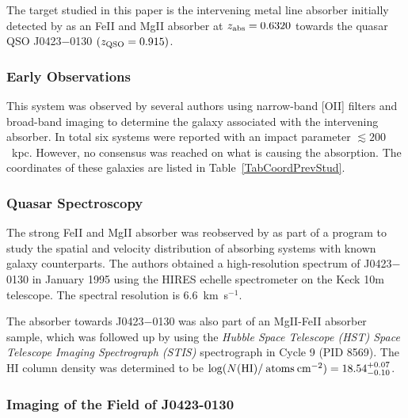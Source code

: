 \documentclass[a4paper,fleqn,usenatbib]{mnras}
\begin{document}
The target studied in this paper is the intervening metal line absorber initially detected by \mbox{\citet{Wills1980Observations}} as an FeII and MgII absorber at $z_{\rm abs} = 0.6320$ towards the quasar QSO J0423$-$0130 $(z_{\rm QSO} = 0.915)$.

\subsubsection{Early Observations}

This system was observed by several authors using narrow-band [OII] filters \mbox{\citep{Yanny1990emission, Yanny1992emission}} and broad-band imaging \mbox{\citep{Churchill1996spatial, Rao2011groundbased}} to determine the galaxy associated with the intervening absorber. In total six systems were reported with an impact parameter $\lesssim 200$~kpc. %
However, no consensus was reached on what is causing the absorption. The coordinates of these galaxies are listed in Table~\ref{TabCoordPrevStud}. 

\subsubsection{Quasar Spectroscopy}

The strong FeII and MgII absorber was reobserved by \mbox{\citet{Churchill1996spatial}} as part of a program to study the spatial and velocity distribution of absorbing systems with known galaxy counterparts. The authors obtained a high-resolution spectrum of J0423$-$0130 in January 1995 using the HIRES echelle spectrometer \mbox{\citep{Vogt1994HIRES}} on the Keck 10m telescope. The spectral resolution is $6.6$~km~s$^{-1}$. 

The absorber towards J0423$-$0130 was also part of an MgII-FeII absorber sample, which was followed up by \mbox{\citet{Rao2006damped}} using the  \textit{Hubble Space Telescope (HST) Space Telescope Imaging Spectrograph (STIS)} spectrograph in Cycle 9 (PID 8569). The HI column density was determined to be $\log( N(\rm{HI}) /\: \text{atoms} \: \text{cm}^{-2}) = 18.54^{+0.07}_{-0.10}$.

\subsubsection{Imaging of the Field of J0423-0130}
\end{document}
